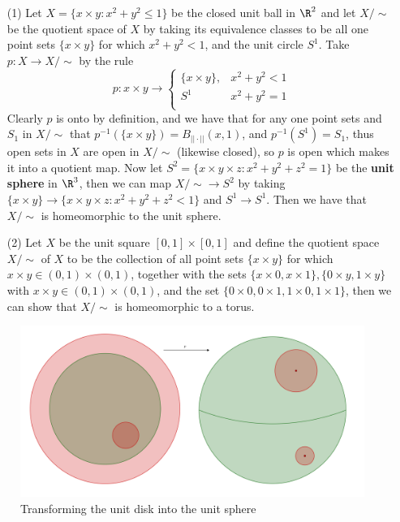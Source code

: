 \begin{example}
    \begin{enumerate}
        \item[(1)] Let $X=\{x \times y: x^2+y^2 \leq 1\}$ be the closed unit ball in $\R^2$ and let  $X/\sim$ be the
    quotient space of  $X$ by taking its equivalence classes to be all one point sets  $\{x \times
    y\}$ for which $x^2+y^2<1$, and the unit circle  $S^1$. Take  $p:X \rightarrow X/\sim$ by the
    rule
        \begin{equation*}
            p:x \times y \rightarrow \begin{cases}
                \{x \times y\}, & x^2+y^2<1 \\
                S^1        & x^2+y^2=1 \\
                      \end{cases}
        \end{equation*}
    Clearly $p$ is onto by definition, and we have that for any one point sets and  $ S_1$ in
    $X/\sim$ that  $p^{-1}(\{x \times y\})=B_{||\cdot||}(x,1)$, and $p^{-1}(S^1)=S_1$, thus open
    sets in $X$ are open in  $X/\sim$  (likewise closed), so $p$ is open which makes it into a
    quotient map. Now let  $S^2=\{x \times y \times z: x^2+y^2+z^2=1\}$ be the \textbf{unit sphere}
    in $\R^3$, then we can map  $X/\sim \rightarrow S^2$ by taking  $\{x \times y\} \rightarrow \{x
    \times y \times z: x^2+y^2+z^2<1\}$ and $ S^1 \rightarrow S^1$. Then we have that $X/\sim$ is
    homeomorphic to the unit sphere.

        \item[(2)] Let $X$ be the unit square  $[0,1] \times [0,1]$ and define the quotient space
            $X/\sim$ of $X$ to be the collection of all point sets $\{x \times y\}$ for which $x
            \times y \in (0,1) \times (0,1)$, together with the sets $\{x \times 0, x \times 1\},
            \{0 \times y, 1 \times y\}$ with $x \times y \in (0,1) \times (0,1)$, and the set $\{0
            \times 0, 0 \times 1, 1 \times 0, 1 \times 1\}$, then we can show that $X/\sim$ is
            homeomorphic to a torus.

    \end{enumerate}
\end{example}

\begin{figure}[h]
    \centering
    \includegraphics[scale = 0.2]{Figures/Chapter2/diskSphere-eps-converted-to.pdf}
    \caption{Transforming the unit disk into the unit sphere}
    \label{fig_2.4}
\end{figure}

